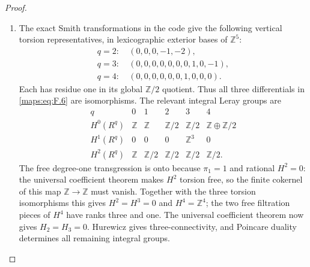 \documentclass[11pt,a4paper]{article}
\theoremstyle{definition}
\begin{document}
\begin{proof}
\begin{enumerate}[label=\arabic*.]
\item The exact Smith transformations in the code give the
following vertical torsion representatives, in lexicographic
exterior bases of $\mathbb Z^5$:
\[
\begin{split}
q=2:\ &(0,0,0,-1,-2),\\
q=3:\ &(0,0,0,0,0,0,0,1,0,-1),\\
q=4:\ &(0,0,0,0,0,0,1,0,0,0).
\end{split}
\]
Each has residue one in its global $\mathbb Z/2$ quotient.
Thus all three differentials in \eqref{maps:eq:F.6} are isomorphisms.
The relevant integral Leray groups are
\[
\begin{array}{c|ccccc}
q&0&1&2&3&4\\ \hline
H^0(R^q)&\mathbb Z&\mathbb Z&\mathbb Z/2&
 \mathbb Z/2&\mathbb Z\oplus\mathbb Z/2\\
H^1(R^q)&0&0&0&\mathbb Z^3&0\\
H^2(R^q)&\mathbb Z&\mathbb Z/2&\mathbb Z/2&
 \mathbb Z/2&\mathbb Z/2 .
\end{array}
\]
The free degree-one transgression is onto because $\pi_1=1$
and rational $H^2=0$: the universal coefficient theorem makes
$H^2$ torsion free, so the finite cokernel of this map
$\mathbb Z\to\mathbb Z$ must vanish.  Together with the three torsion
isomorphisms this gives $H^2=H^3=0$ and $H^4=\mathbb Z^4$;
the two free filtration pieces of $H^4$ have ranks three
and one.  The universal coefficient theorem now gives
$H_2=H_3=0$.  Hurewicz gives three-connectivity, and Poincare
duality determines all remaining integral groups.

\end{enumerate}
\end{proof}
\end{document}
